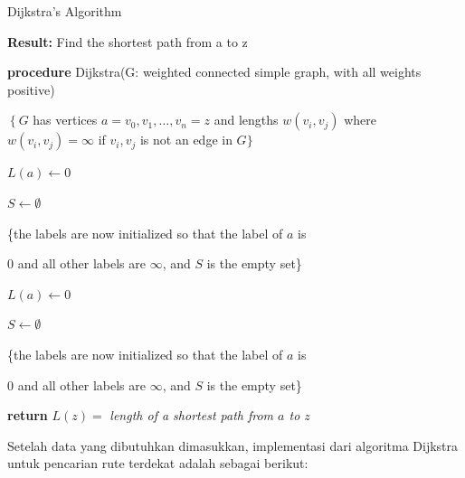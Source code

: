 \documentclass[10pt]{IEEEtran}
\begin{document}
\begin{algorithm}

\caption{Dijkstra’s Algorithm}
\label{alg:two}

\textbf{Result:} Find the shortest path from a to $\mathrm{z}$

\textbf{procedure} Dijkstra(G: weighted connected simple graph, with all weights positive)

$\left\{G\right.$ has vertices $a=v_{0}, v_{1}, \ldots, v_{n}=z$ and lengths $w\left(v_{i}, v_{j}\right)$ where $w\left(v_{i}, v_{j}\right)=\infty$ if $v_{i}, v_{j}$ is not an edge in $G\}$


$L(a)\gets0$

$S\gets\emptyset$

\{the labels are now initialized so that the label of $a$ is

0 and all other labels are $\infty$, and $S$ is the empty set\}


$L(a)\gets0$

$S\gets\emptyset$

\{the labels are now initialized so that the label of $a$ is

0 and all other labels are $\infty$, and $S$ is the empty set\}

\textbf{return} $L(z) =$ \textit{length of a shortest path from $a$ to $z$}
\end{algorithm}

Setelah data yang dibutuhkan dimasukkan, implementasi
dari algoritma Dijkstra untuk pencarian rute terdekat adalah
sebagai berikut:
\end{document}
